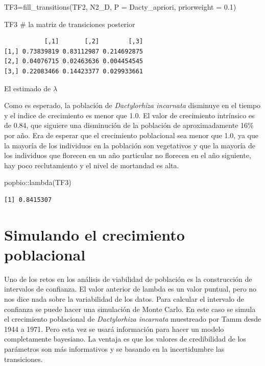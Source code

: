 \documentclass[
  12pt,
  letterpaper,
]{book}
\newenvironment{Shaded}{\begin{snugshade}}{\end{snugshade}}
\newcommand{\AttributeTok}[1]{\textcolor[rgb]{0.40,0.45,0.13}{#1}}
\newcommand{\CommentTok}[1]{\textcolor[rgb]{0.37,0.37,0.37}{#1}}
\newcommand{\FloatTok}[1]{\textcolor[rgb]{0.68,0.00,0.00}{#1}}
\newcommand{\FunctionTok}[1]{\textcolor[rgb]{0.28,0.35,0.67}{#1}}
\newcommand{\NormalTok}[1]{\textcolor[rgb]{0.00,0.23,0.31}{#1}}
\newcommand{\OtherTok}[1]{\textcolor[rgb]{0.00,0.23,0.31}{#1}}
\newcommand{\SpecialCharTok}[1]{\textcolor[rgb]{0.37,0.37,0.37}{#1}}
\begin{document}
\begin{Shaded}
\begin{Highlighting}[]
\NormalTok{TF3}\OtherTok{=}\FunctionTok{fill\_transitions}\NormalTok{(TF2, N2\_D, }\AttributeTok{P =}\NormalTok{ Dacty\_apriori, }\AttributeTok{priorweight =} \FloatTok{0.1}\NormalTok{)}

\NormalTok{TF3 }\CommentTok{\# la matriz de transiciones posterior}
\end{Highlighting}
\end{Shaded}

\begin{verbatim}
           [,1]       [,2]        [,3]
[1,] 0.73839819 0.83112987 0.214692875
[2,] 0.04076715 0.02463636 0.004454545
[3,] 0.22083466 0.14423377 0.029933661
\end{verbatim}

El estimado de \(\lambda\)

Como es esperado, la población de \emph{Dactylorhiza incarnata}
disminuye en el tiempo y el indice de crecimiento es menor que 1.0. El
valor de crecimiento intrínsico es de 0.84, que siguiere una disminución
de la población de aproximadamente 16\% por año. Era de esperar que el
crecimiento poblacional sea menor que 1.0, ya que la mayoría de los
individuos en la población son vegetativos y que la mayoría de los
individuos que florecen en un año particular no florecen en el año
siguiente, hay poco reclutamiento y el nivel de mortandad es alta.

\begin{Shaded}
\begin{Highlighting}[]
\NormalTok{popbio}\SpecialCharTok{::}\FunctionTok{lambda}\NormalTok{(TF3)}
\end{Highlighting}
\end{Shaded}

\begin{verbatim}
[1] 0.8415307
\end{verbatim}

\section{Simulando el crecimiento
poblacional}\label{simulando-el-crecimiento-poblacional}

Uno de los retos en los análisis de viabilidad de población es la
construcción de intervalos de confianza. El valor anterior de lambda es
un valor puntual, pero no nos dice nada sobre la variabilidad de los
datos. Para calcular el intervalo de confianza se puede hacer una
simulación de Monte Carlo. En este caso se simula el crecimiento
poblacional de \emph{Dactylorhiza incarnata} muestreado por Tamm desde
1944 a 1971. Pero esta vez se usará información para hacer un modelo
completamente bayesiano. La ventaja es que los valores de credibilidad
de los parámetros son más informativos y se basando en la incertidumbre
las transiciones.
\end{document}
